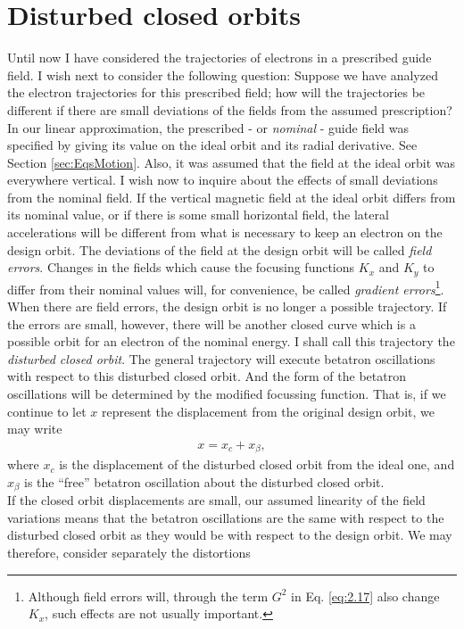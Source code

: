 \section{Disturbed closed orbits}\label{sec:2.10}

Until now I have considered the trajectories of electrons in a prescribed guide field. I wish next to consider the following question: Suppose we have analyzed the electron trajectories for this prescribed field; how will the trajectories be different if there are small deviations of the fields from the assumed prescription? In our linear approximation, the prescribed - or \emph{nominal} - guide field was specified by giving its value on the ideal orbit and its radial derivative. See Section \ref{sec:EqsMotion}. Also, it was assumed that the field at the ideal orbit was everywhere vertical. I wish now to inquire about the effects of small deviations from the nominal field. If the vertical magnetic field at the ideal orbit differs
 from its nominal value, or if there is some small horizontal field, the lateral accelerations
will be different from what is necessary to keep an electron on the design orbit. The deviations
 of the field at the design orbit will be called \emph{field errors}. Changes in the fields which cause the focusing functions $K_x$ and $K_y$ to differ from their nominal values will, for convenience, be called \emph{gradient errors}\footnote{Although field errors will, through the term $G^2$ in Eq. \eqref{eq:2.17} also change $K_x$, such effects are not usually important.}.\\
When there are field errors, the design orbit is no longer a possible trajectory. If the errors
 are small, however, there will be another closed curve which is a possible orbit for an electron
 of the nominal energy. I shall call this trajectory the \emph{disturbed closed orbit}. The general trajectory will execute betatron oscillations with respect to this disturbed closed orbit. And the form of the betatron oscillations will be determined by the modified focussing function. That is, if we continue to let $x$ represent the displacement from the original design orbit, we may write
\begin{align}\label{eq:2.83}
	x = x_c + x_\beta,
\end{align}
where $x_c$ is the displacement of the disturbed closed orbit from the ideal one, and $x_\beta$ is the “free” betatron oscillation about the disturbed closed orbit.\\
If the closed orbit displacements are small, our assumed linearity of the field variations means that the betatron oscillations are the same with respect to the disturbed closed orbit as they would be with respect to the design orbit. We may therefore, consider separately the distortions
